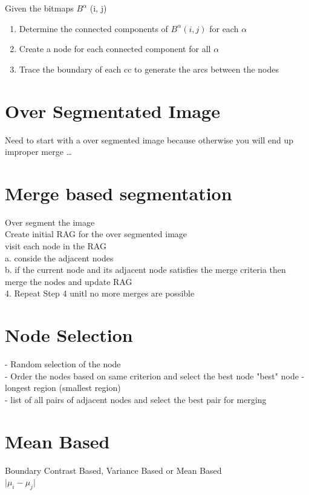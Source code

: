 \documentclass[11pt]{article}
\theoremstyle{definition}
\begin{document}
Given the bitmaps $B^\alpha$ (i, j)
\begin{enumerate}
    \item Determine the connected components of $B^\alpha(i,j)$ for each $\alpha$
    \item Create a node for each connected component for all $\alpha$
    \item Trace the boundary of each cc to generate the arcs between the nodes
\end{enumerate}

\section{Over Segmentated Image}
Need to start with a over segmented image because otherwise you will end up improper merge
\ldots

\section{Merge based segmentation}

Over segment the image\\
Create initial RAG for the over segmented image\\
visit each node in the RAG\\
a. conside the adjacent nodes\\
b. if the current node and its adjacent node satisfies the merge criteria then merge the nodes and update RAG\\
4. Repeat Step 4 unitl no more merges are possible

\section{Node Selection}
- Random selection of the node\\
- Order the nodes based on same criterion and select the best node
"best" node - longest region (smallest region) \\ 
- list of all pairs of adjacent nodes and select the best pair for merging

\section{Mean Based}
Boundary Contrast Based, Variance Based or Mean Based \\
$\vert \mu_i - \mu_j \vert$

\end{document}
